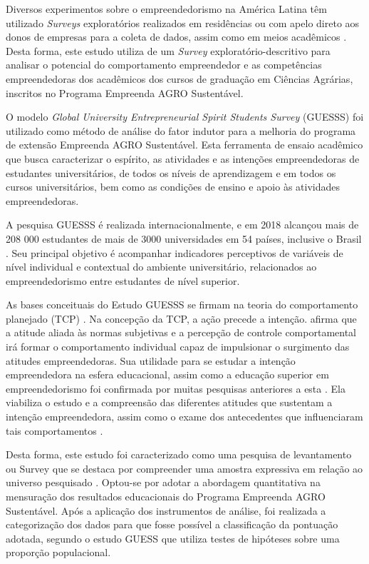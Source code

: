 Diversos experimentos sobre o empreendedorismo na América Latina têm utilizado \textit{Surveys} exploratórios realizados em residências ou com apelo direto aos donos de empresas para a coleta de dados, assim como em meios acadêmicos \cite{lima_ser_2015}. Desta forma, este estudo utiliza de um \textit{Survey} exploratório-descritivo para analisar o potencial do comportamento empreendedor e as competências empreendedoras dos acadêmicos dos cursos de graduação em Ciências Agrárias, inscritos no Programa Empreenda AGRO Sustentável. 

O modelo \textit{Global University Entrepreneurial Spirit Students Survey} (GUESSS) foi utilizado como método de análise do fator indutor para a melhoria do programa de extensão Empreenda AGRO Sustentável. Esta ferramenta de ensaio acadêmico que busca caracterizar o espírito, as atividades e as intenções empreendedoras de estudantes universitários, de todos os níveis de aprendizagem e em todos os cursos universitários, bem como as condições de ensino e apoio às atividades empreendedoras.


A pesquisa GUESSS é realizada internacionalmente, e em 2018 alcançou mais de 208 000 estudantes de mais de 3000 universidades em 54 países, inclusive o Brasil \cite{sieger_global_2018}. Seu principal objetivo é acompanhar indicadores perceptivos de variáveis de nível individual e contextual do ambiente universitário, relacionados ao empreendedorismo entre estudantes de nível superior.

As bases conceituais do Estudo GUESSS se firmam na teoria do comportamento planejado (TCP) \cite{ajzen_perceived_2002}. Na concepção da TCP, a ação precede a intenção.  afirma que a atitude aliada às normas subjetivas e a percepção de controle comportamental irá formar o comportamento individual capaz de impulsionar o surgimento das atitudes empreendedoras. Sua utilidade para se estudar a intenção empreendedora na esfera educacional, assim como a educação superior em empreendedorismo foi confirmada por muitas pesquisas anteriores a esta \cite{krueger_potencial_2018,gonzalez_predictors_2009,fayolle_effect_2006}. Ela viabiliza o estudo e a compreensão das diferentes atitudes que sustentam a intenção empreendedora, assim como o exame dos antecedentes que influenciaram tais comportamentos \cite{lima_educacao_2014}. 

Desta forma, este estudo foi caracterizado como uma pesquisa de levantamento ou Survey que se destaca por compreender uma amostra expressiva em relação ao universo pesquisado \cite{freitas_o_2000}. Optou-se por adotar a abordagem quantitativa na mensuração dos resultados educacionais do Programa Empreenda AGRO Sustentável. Após a aplicação dos instrumentos de análise, foi realizada a categorização dos dados para que fosse possível a classificação da pontuação adotada, segundo o estudo GUESS \cite{meoli_how_2019} que utiliza testes de hipóteses sobre uma proporção populacional. 


